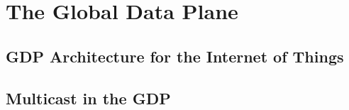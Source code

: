 \chapter{The Global Data Plane}

\section{GDP Architecture for the Internet of Things}



\section{Multicast in the GDP}


